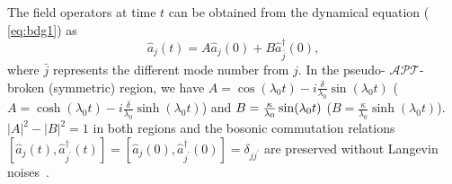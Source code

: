 \documentclass[twocolumn,prl,floatfix,citeautoscript,nofootinbib,superscriptaddress]{revtex4}
\begin{document}
The field operators at time $t$ can be obtained from the dynamical equation (%
\ref{eq:bdg1}) as~\cite{SM}
\begin{equation}
\hat{a}_{j}(t)=A\hat{a}_{j}(0)+B\hat{a}_{\bar{j}}^{\dag }(0),
\label{fieldoperator}
\end{equation}%
where $\bar{j}$ represents the different mode number from $j$. In the pseudo-%
$\mathcal{APT}$-broken (symmetric) region, we have $A=\cos (\lambda _{0}t)-i%
\frac{\delta }{\lambda _{0}}\sin (\lambda _{0}t)$ ($A=\cosh (\lambda _{0}t)-i%
\frac{\delta }{\lambda _{0}}\sinh (\lambda _{0}t)$) and $B=\frac{\kappa }{%
\lambda _{0}}\sin (\lambda _{0}t)$ ($B=\frac{\kappa }{\lambda _{0}}\sinh
(\lambda _{0}t)$). $|A|^{2}-|B|^{2}=1$ in both regions and the bosonic
commutation relations $[\hat{a}_{j}(t),\hat{a}_{j^{\prime }}^{\dag }(t)]=[%
\hat{a}_{j}(0),\hat{a}_{j^{\prime }}^{\dag }(0)]=\delta _{jj^{\prime }}$ are
preserved without Langevin noises~\cite{SM}.
\end{document}
